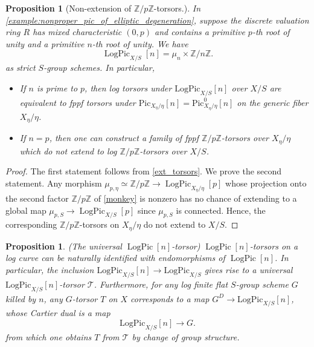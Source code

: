 \documentclass[a4paper,11pt]{amsart} %
\numberwithin{equation}{subsection}
\newcommand{\on}[1]{\operatorname{#1}}
\newcommand{\bb}[1]{{\mathbb{#1}}}
\newcommand{\ca}[1]{{\mathcal{#1}}}
\theoremstyle{definition}
\theoremstyle{plain}%
\newtheorem{proposition}[definition]{Proposition}
\theoremstyle{remark}
\begin{document}
\begin{proposition}[Non-extension of $\mathbb{Z}/p\mathbb{Z}$-torsors.]\label{non-ext}
      In \ref{example:nonproper_pic_of_elliptic_degeneration}, suppose the discrete valuation ring $R$ has mixed characteristic $(0,p)$ and contains a primitive $p$-th root of unity and a primitive $n$-th root of unity. We have
    \begin{equation}\label{monkey}
          \on{LogPic}_{X/S}[n]=\mu_n \times \bb Z/n\bb Z.
      \end{equation}
    as strict $S$-group schemes. In particular,
    \begin{itemize}
        \item If $n$ is prime to $p$, then log torsors under $\mathrm{LogPic}_{X/S}[n]$ over $X/S$ are equivalent to fppf torsors under $\mathrm{Pic}_{X_{\eta}/\eta}[n]=\mathrm{Pic}^0_{X_{\eta}/\eta}[n]$ on the generic fiber $X_{\eta}/\eta$.
        \item If $n=p$, then one can construct a family of fppf $\mathbb{Z}/p\mathbb{Z}$-torsors over $X_{\eta}/\eta$ which do not extend to log $\mathbb{Z}/p\mathbb{Z}$-torsors over $X/S$.
        
\end{itemize}
    \end{proposition}    
        
     \begin{proof} The first statement follows from \ref{ext_torsors}.
         We prove the second statement. Any morphism $\mu_{p,\eta} \simeq \bb Z/p\bb Z \to \on{LogPic}_{X_\eta/\eta}[p]$ whose projection onto the second factor $\bb Z/p\bb Z$ of \ref{monkey} is nonzero has no chance of extending to a global map $\mu_{p,S} \to \on{LogPic}_{X/S}[p]$ since $\mu_{p,S}$ is connected. Hence, the corresponding $\bb Z/p\bb Z$-torsors on $X_\eta/\eta$ do not extend to $X/S$.

     \end{proof}   
     



\begin{proposition} \label{LogJac[n]} (The universal $\on{LogPic}[n]$-torsor)
$\on{LogPic}[n]$-torsors on a log curve can be naturally identified with endomorphisms of $\on{LogPic}[n]$. In particular, the inclusion $\mathrm{LogPic}_{X/S}[n] \to \mathrm{LogPic}_{X/S}$ gives rise to a \emph{universal $\mathrm{LogPic}_{X/S}[n]$-torsor} $\ca T$. Furthermore, for any log finite flat $S$-group scheme $G$ killed by $n$, any $G$-torsor $T$ on $X$ corresponds to a map $G^D \to \mathrm{LogPic}_{X/S}[n]$, whose Cartier dual is a map
\begin{equation}\label{rabbit}
    \mathrm{LogPic}_{X/S}[n] \to G.
\end{equation}
from which one obtains $T$ from $\ca T$ by change of group structure.
\end{proposition}
\end{document}
